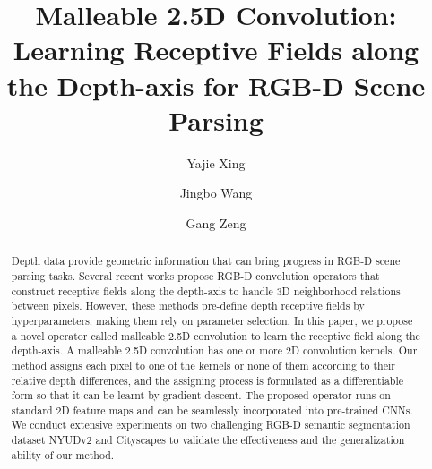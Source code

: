 \documentclass[runningheads]{llncs}
\begin{document}
\pagestyle{headings}
\mainmatter
\def\ECCVSubNumber{3295}  

\title{Malleable 2.5D Convolution: Learning Receptive Fields along the Depth-axis for RGB-D Scene Parsing} 

\begin{comment}
\titlerunning{ECCV-20 submission ID \ECCVSubNumber}
\authorrunning{ECCV-20 submission ID \ECCVSubNumber}
\author{Anonymous ECCV submission}
\institute{Paper ID \ECCVSubNumber}
\end{comment}


\author{Yajie Xing \and
Jingbo Wang \and
Gang Zeng}
\maketitle

\begin{abstract}
  Depth data provide geometric information that can bring progress in RGB-D scene parsing tasks.
  Several recent works propose RGB-D convolution operators that construct receptive fields along the depth-axis to handle 3D neighborhood relations between pixels.
  However, these methods pre-define depth receptive fields by hyperparameters, making them rely on parameter selection.
  In this paper, we propose a novel operator called malleable 2.5D convolution to learn the receptive field along the depth-axis.
  A malleable 2.5D convolution has one or more 2D convolution kernels.
  Our method assigns each pixel to one of the kernels or none of them according to their relative depth differences, and the assigning process is formulated as a differentiable form so that it can be learnt by gradient descent.
  The proposed operator runs on standard 2D feature maps and can be seamlessly incorporated into pre-trained CNNs.
  We conduct extensive experiments on two challenging RGB-D semantic segmentation dataset NYUDv2 and Cityscapes to validate the effectiveness and the generalization ability of our method.
\end{abstract}
\end{document}
